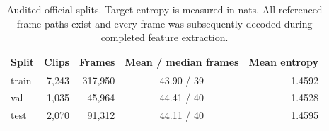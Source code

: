 \begin{table}[!htbp]
\centering
\small
\setlength{\tabcolsep}{5pt}
\begin{tabular}{lrrcr}
\toprule
Split & Clips & Frames & Mean / median frames & Mean entropy \\
\midrule
train & 7,243 & 317,950 & 43.90 / 39 & 1.4592 \\
val & 1,035 & 45,964 & 44.41 / 40 & 1.4528 \\
test & 2,070 & 91,312 & 44.11 / 40 & 1.4595 \\
\bottomrule
\end{tabular}
\caption{Audited official splits. Target entropy is measured in nats. All referenced frame paths exist and every frame was subsequently decoded during completed feature extraction.}
\label{tab:dataset}
\end{table}
